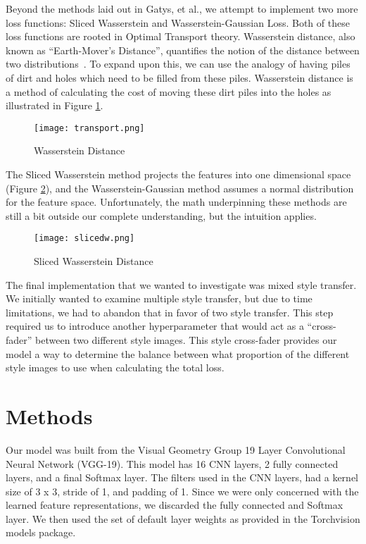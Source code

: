 \documentclass[12pt]{article}
\begin{document}
Beyond the methods laid out in Gatys, et al., we attempt to
implement two more loss functions: Sliced Wasserstein and Wasserstein-Gaussian
Loss.  Both of these
loss functions are rooted in Optimal Transport theory.  Wasserstein distance,
also known as ``Earth-Mover's Distance'', quantifies the notion of the distance
between two distributions~\cite{williams}.  To expand upon this, we can use the analogy of
having piles of dirt and holes which need to be filled from these piles.
Wasserstein distance is a method of calculating the cost of moving these dirt
piles into the holes as illustrated in Figure \ref{fig:wd}.
\begin{figure}[h]
    \centering
    \texttt{[image: transport.png]}
    \caption{Wasserstein Distance}
    \label{fig:wd}
\end{figure}

The Sliced Wasserstein method projects the features into one dimensional
space (Figure \ref{fig:swd}), and the Wasserstein-Gaussian method assumes a normal distribution for the
feature space.  Unfortunately, the math underpinning these methods are still a
bit outside our complete understanding, but the intuition applies.
\begin{figure}[h]
    \centering
    \texttt{[image: slicedw.png]}
    \caption{Sliced Wasserstein Distance}
    \label{fig:swd}
\end{figure}

The final implementation that we wanted to investigate was mixed style transfer.
We initially wanted to examine multiple style transfer, but due to time
limitations, we had to abandon that in favor of two style transfer.  This step
required us to introduce another hyperparameter that would act as a
“cross-fader” between two different style images.  This style cross-fader
provides our model a way to determine the balance between what proportion of the
different style images to use when calculating the total loss.

\section{Methods}
Our model was built from the Visual Geometry Group 19 Layer Convolutional Neural
Network (VGG-19).  This model has 16 CNN layers, 2 fully connected layers, and a
final Softmax layer.  The filters used in the CNN layers, had a kernel size of 3
x 3, stride of 1, and padding of 1.  Since we were only concerned with the
learned feature representations, we discarded the fully connected and Softmax
layer.  We then used the set of default layer weights as provided in the
Torchvision models package.
\end{document}
